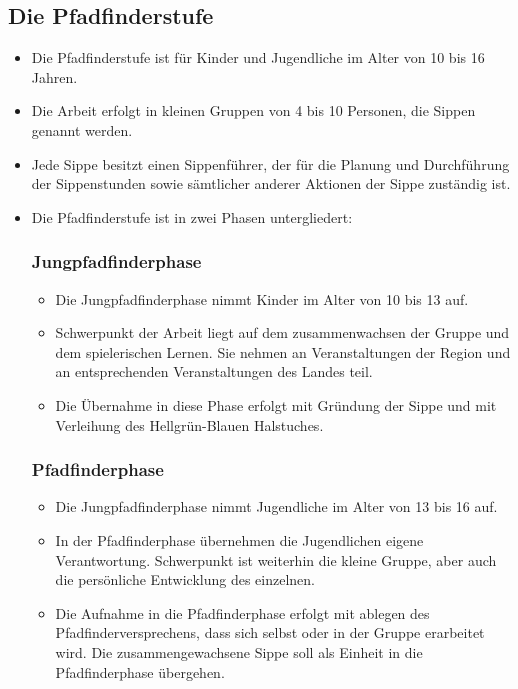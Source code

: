 \documentclass[a4paper]{article}
\begin{document}
    \subsection{Die Pfadfinderstufe} %
    \label{sub:die_pfadfinderstufe}
    \begin{itemize}
        \item Die Pfadfinderstufe ist für Kinder und Jugendliche im Alter von 10 bis 16 Jahren. 
        \item Die Arbeit erfolgt in kleinen Gruppen von 4 bis 10 Personen, die Sippen genannt werden.
        \item Jede Sippe besitzt einen Sippenführer, der für die Planung und Durchführung der Sippenstunden sowie sämtlicher anderer Aktionen der Sippe zuständig ist. 
        \item Die Pfadfinderstufe ist in zwei Phasen untergliedert:
        \subsubsection{Jungpfadfinderphase} %
        \label{ssub:jungpfadfinderphase}
            \begin{itemize}
                \item Die Jungpfadfinderphase nimmt Kinder im Alter von 10 bis 13 auf.
                \item Schwerpunkt der Arbeit liegt auf dem zusammenwachsen der Gruppe und dem spielerischen Lernen. Sie nehmen an Veranstaltungen der Region und an entsprechenden Veranstaltungen des Landes teil.
                \item Die Übernahme in diese Phase erfolgt mit Gründung der Sippe und mit Verleihung des Hellgrün-Blauen Halstuches.
            \end{itemize}
        \subsubsection{Pfadfinderphase} %
        \label{ssub:pfadfinderphase}
        \begin{itemize}
            \item Die Jungpfadfinderphase nimmt Jugendliche im Alter von 13 bis 16 auf.
            \item In der Pfadfinderphase übernehmen die Jugendlichen eigene Verantwortung. Schwerpunkt ist weiterhin die kleine Gruppe, aber auch die persönliche Entwicklung des einzelnen. 
            \item Die Aufnahme in die Pfadfinderphase erfolgt mit ablegen des Pfadfinderversprechens, dass sich selbst oder in der Gruppe erarbeitet wird. Die zusammengewachsene Sippe soll als Einheit in die Pfadfinderphase übergehen.
        \end{itemize}
    \end{itemize}
    
\end{document}
